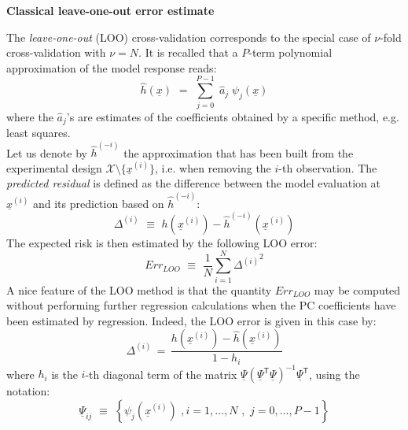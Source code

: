 {\textbf{Classical leave-one-out error estimate} \vspace{2mm}

The \emph{leave-one-out} (LOO) cross-validation corresponds to the special case of $\nu$-fold cross-validation with $\nu = N$. It is recalled that a $P$-term polynomial approximation of the model response reads:
\begin{equation} 
	\widehat{h}(\underline{x}) \, \, = \, \,  \sum_{j=0}^{P-1} \; \widehat{a}_{j} \; \psi_{j}(\underline{x})
\end{equation} 
where the $\widehat{a}_{j}$'s are estimates of the coefficients obtained by a specific method, e.g. least squares. \\

Let us denote by $\widehat{h}^{(-i)}$ the approximation that has been built from the experimental design $\mathcal{X} \setminus \{\underline{x}^{(i)}\}$, i.e. when removing the $i$-th observation. The \emph{predicted residual} is defined as the difference between the model evaluation at $\underline{x}^{(i)}$ and its prediction based on $\widehat{h}^{(-i)}$:
\begin{equation} \label{eq:4.3:5}
	\Delta^{(i)} \, \, \equiv \, \,  h(\underline{x}^{(i)}) - \widehat{h}^{(-i)}(\underline{x}^{(i)})
\end{equation}
The expected risk is then estimated by the following LOO error:
\begin{equation}\label{eq:4.3:6}
	Err_{LOO} \, \, \equiv \, \, \frac{1}{N} \sum_{i=1}^{N} {\Delta^{(i)}}^{2}
\end{equation}
A nice feature of the LOO method is that the quantity $Err_{LOO}$ may be computed without performing further regression calculations when the PC coefficients have been estimated by regression. Indeed, the LOO error is given in this case by:
\begin{equation} \label{eq:4.3:7}
	\Delta^{(i)} \, = \, 
	\frac{h(\underline{x}^{(i)}) - \widehat{h}(\underline{x}^{(i)})}{1 - h_i}
\end{equation}
where $h_i$ is the $i$-th diagonal term of the matrix $\underline{\Psi} (\underline{\Psi}^{\textsf{T}}\underline{\Psi})^{-1}\underline{\Psi}^{\textsf{T}}$, using the notation:
\begin{equation} \label{eq:4.3:7bis}
	\underline{\Psi}_{ij} \, \, \equiv \, \, \left\{\psi_{j}(\underline{x}^{(i)}) \, \, , i=1,\dots,N  \, \, , \, \, j=0,\dots,P-1 \right\}
\end{equation} 

}
